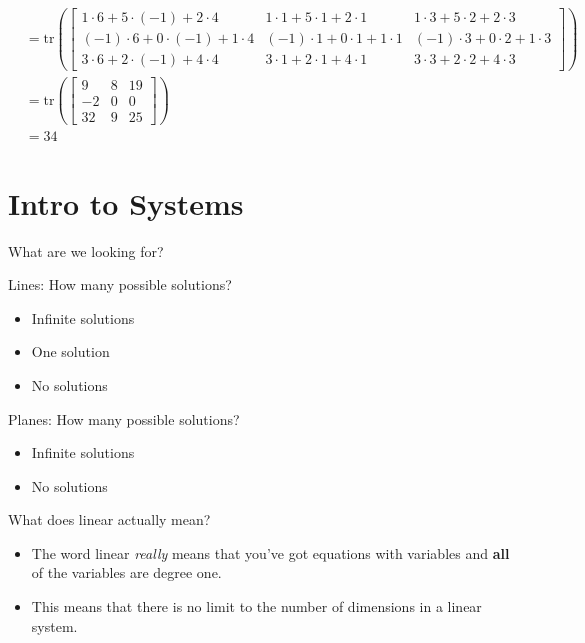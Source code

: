 \documentclass[
  letterpaper,
  DIV=11,
  numbers=noendperiod]{scrartcl}
\providecommand{\tightlist}{%
  \setlength{\itemsep}{0pt}\setlength{\parskip}{0pt}}\usepackage{longtable,booktabs,array}
\begin{document}
\begin{enumerate}
\begin{align*}
  &= \mathrm{tr}\left(\begin{bmatrix}1 \cdot 6 + 5 \cdot (-1) + 2 \cdot 4 & 1 \cdot 1 + 5 \cdot 1 + 2 \cdot 1 & 1 \cdot 3 + 5 \cdot 2 + 2 \cdot 3 \\ (-1) \cdot 6 + 0 \cdot (-1) + 1 \cdot 4 & (-1) \cdot 1 + 0 \cdot 1 + 1 \cdot 1 & (-1) \cdot 3 + 0 \cdot 2 + 1 \cdot 3 \\ 3 \cdot 6 + 2 \cdot (-1) + 4 \cdot 4 & 3 \cdot 1 + 2 \cdot 1 + 4 \cdot 1 & 3 \cdot 3 + 2 \cdot 2 + 4 \cdot 3 \end{bmatrix}\right) \\
  &= \mathrm{tr}\left(\begin{bmatrix} 9 & 8 & 19 \\ -2 & 0 & 0 \\ 32 & 9 & 25 \end{bmatrix}\right) \\
  &= 34
  \end{align*}
\end{enumerate}

\hypertarget{intro-to-systems}{%
\section{Intro to Systems}\label{intro-to-systems}}

What are we looking for?

Lines: How many possible solutions?

\begin{itemize}
\tightlist
\item
  Infinite solutions
\item
  One solution
\item
  No solutions
\end{itemize}

Planes: How many possible solutions?

\begin{itemize}
\tightlist
\item
  Infinite solutions
\item
  No solutions
\end{itemize}

What does linear actually mean?

\begin{itemize}
\tightlist
\item
  The word linear \emph{really} means that you've got equations with
  variables and \textbf{all} of the variables are degree one.
\item
  This means that there is no limit to the number of dimensions in a
  linear system.
\end{itemize}
\end{document}
